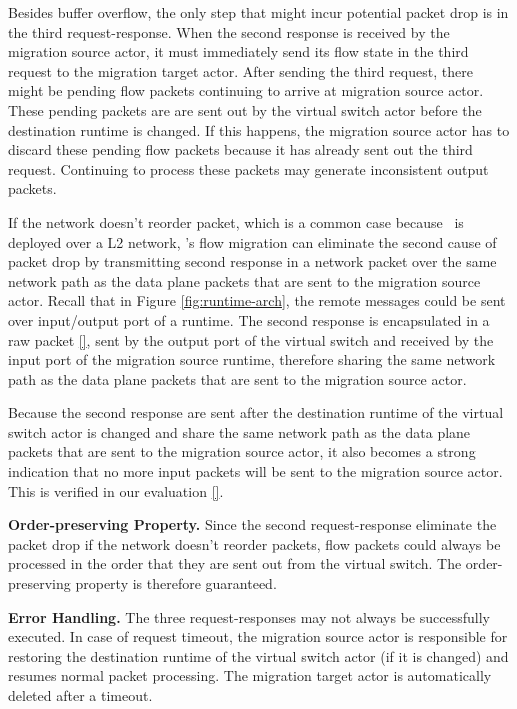 Besides buffer overflow, the only step that might incur potential packet drop is in the third request-response. When the second response is received by the migration source actor, it must immediately send its flow state in the third request to the migration target actor. After sending the third request, there might be pending flow packets continuing to arrive at migration source actor. These pending packets are are sent out by the virtual switch actor before the destination runtime is changed. If this happens, the migration source actor has to discard these pending flow packets because it has already sent out the third request. Continuing to process these packets may generate inconsistent output packets.

If the network doesn't reorder packet, which is a common case because \nfactor~is deployed over a L2 network, \nfactor's flow migration can eliminate the second cause of packet drop by transmitting second response in a network packet over the same network path as the data plane packets that are sent to the migration source actor. Recall that in Figure \ref{fig:runtime-arch}, the remote messages could be sent over input/output port of a runtime. The second response is encapsulated in a raw packet \ref{}, sent by the output port of the virtual switch and received by the input port of the migration source runtime, therefore sharing the same network path as the data plane packets that are sent to the migration source actor.

Because the second response are sent after the destination runtime of the virtual switch actor is changed and share the same network path as the data plane packets that are sent to the migration source actor, it also becomes a strong indication that no more input packets will be sent to the migration source actor. This is verified in our evaluation \ref{}.

\textbf{Order-preserving Property.} Since the second request-response eliminate the packet drop if the network doesn't reorder packets, flow packets could always be processed in the order that they are sent out from the virtual switch. The order-preserving property is therefore guaranteed.

\textbf{Error Handling.} The three request-responses may not always be successfully executed. In case of request timeout, the migration source actor is responsible for restoring the destination runtime of the virtual switch actor (if it is changed) and resumes normal packet processing. The migration target actor is automatically deleted after a timeout.

